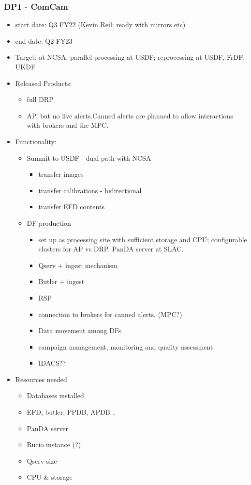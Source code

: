 \subsubsection{ \gls{DP1} - ComCam}
\begin{itemize}
\item start date: Q3 FY22 (Kevin Reil: ready with mirrors etc)
\item end date: Q2 FY23
\item Target: at NCSA; parallel processing at USDF; reprocessing at USDF, FrDF, UKDF
\item Released Products:
\begin{itemize}
\item full \gls{DRP}
\item \gls{AP}, but no live alerts.Canned alerts are planned to allow
  interactions with brokers and the MPC.
\end{itemize}
\item Functionality:
\begin{itemize}
\item Summit to \gls{USDF}  - dual path with NCSA
\begin{itemize}
\item transfer images
\item transfer calibrations - bidirectional
\item transfer \gls{EFD} contents
\end{itemize}
\item \gls{DF} production
\begin{itemize}
\item set up as processing site with sufficient storage and \gls{CPU};
  configurable clusters for AP vs DRP. PanDA server at SLAC.
\item \gls{Qserv} + ingest mechanism
\item \gls{Butler} + ingest
\item \gls{RSP}
\item connection to brokers for canned alerts. (\gls{MPC}?)
\item Data movement among DFs
\item campaign management, \gls{monitoring} and quality assessment
\item IDACS??
\end{itemize}
\end{itemize}
\item Resources needed
\begin{itemize}
\item Databases installed
\item \gls{EFD}, butler, PPDB, APDB...
\item \gls{PanDA} server
\item Rucio instance (?)
\item \gls{Qserv} size
\item \gls{CPU} \& storage
\end{itemize}
\end{itemize}
